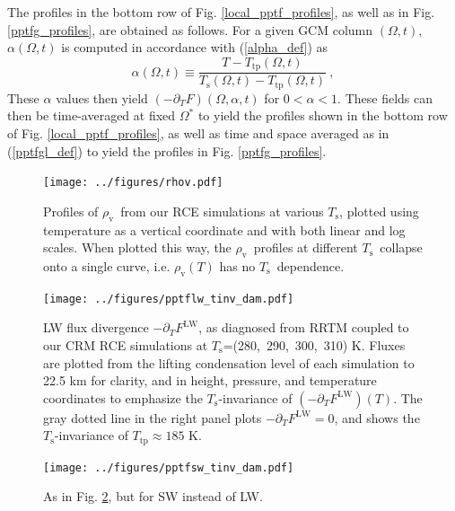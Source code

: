 \documentclass[10pt]{article}
\newcommand{\beqn}{\begin{equation}}
\newcommand{\eeqn}{\end{equation}}
\newcommand{\eqnref}[1]{(\ref{#1})}
\newcommand{\n}{\nonumber}
\newcommand{\ppt}{\ensuremath{\partial_T}}
\newcommand{\FLW}{\ensuremath{F^\mathrm{LW}}}
\newcommand{\rhov}{\ensuremath{\rho_\mathrm{v}}}
\newcommand{\Ts}{\ensuremath{T_\mathrm{s}}}
\newcommand{\Ttp}{\ensuremath{T_\mathrm{tp}}}
\begin{document}

The profiles in the bottom row of Fig. \ref{local_pptf_profiles}, as well as in Fig. \ref{pptfg_profiles}, are obtained as follows. For a given GCM column $(\Omega,t)$, $\alpha(\Omega,t)$ is computed in accordance with \eqnref{alpha_def} as 
\beqn
	\alpha(\Omega,t) \equiv \frac{T-\Ttp(\Omega,t)}{\Ts(\Omega,t) - \Ttp(\Omega,t)}\ ,
	\label{alpha_def2}
	\n
\eeqn
These $\alpha$ values then yield $(-\ppt F)(\Omega,\alpha,t)$	for $0 < \alpha < 1$. These fields can then be time-averaged at fixed $\Omega^*$ to yield the profiles shown in the bottom row of Fig. \ref{local_pptf_profiles}, as well as time and space averaged  as in \eqnref{pptfgl_def} to yield the profiles in Fig. \ref{pptfg_profiles}. 

\pagebreak

\begin{figure}[h]
	\begin{center}
			\texttt{[image: ../figures/rhov.pdf]}
		\caption{Profiles of \rhov\ from our RCE simulations at various \Ts, plotted using temperature as a vertical coordinate and with both linear and log scales. When plotted this way, the \rhov\ profiles at different \Ts\ collapse onto a single curve, i.e. $\rhov(T)$ has no \Ts\ dependence. 
		\label{rhov_fig}
		}
	\end{center}
\end{figure}



\begin{figure}[h]
	\begin{center}
			\texttt{[image: ../figures/pptflw\_tinv\_dam.pdf]}
		\caption{LW flux divergence  $-\ppt \FLW$, as diagnosed from RRTM coupled to our CRM RCE simulations at \Ts=(280,\ 290,\ 300,\ 310) K. Fluxes are plotted from the lifting condensation level of each simulation to 22.5 km for clarity, and  in height, pressure, and temperature coordinates to emphasize the \Ts-invariance of  $(-\ppt \FLW)(T)$. The gray dotted line in the right panel plots $-\ppt \FLW = 0$, and shows the \Ts-invariance of $\Ttp \approx 185$ K.
		\label{pptflw_tinv_dam}
		}
	\end{center}
\end{figure}

\begin{figure}[h]
	\begin{center}
			\texttt{[image: ../figures/pptfsw\_tinv\_dam.pdf]}
		\caption{As in Fig. \ref{pptflw_tinv_dam}, but for SW instead of LW.
		\label{pptfsw_tinv_dam}
		}
	\end{center}
\end{figure}
\end{document}
